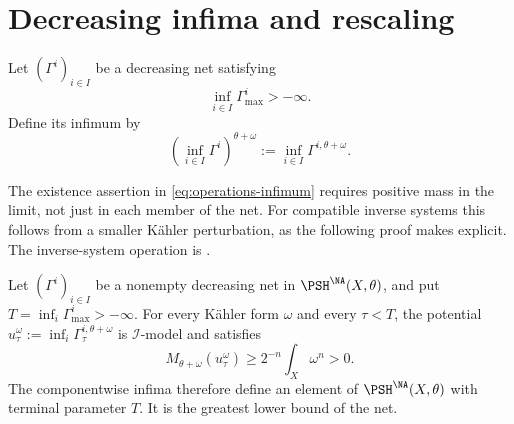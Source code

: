 \section{Decreasing infima and rescaling}
\label{sec:operations-infima-rescaling}

\begin{definition}
\label{def:operations-infimum}
Let $(\Gamma^i)_{i\in I}$ be a decreasing net satisfying
\[
                   \inf_{i\in I}\Gamma^i_{\max}>-\infty.
\tag{54.10}\label{eq:operations-inf-bound}
\]
Define its infimum by
\[
 \left(\inf_{i\in I}\Gamma^i\right)^{\theta+\omega}
 :=\inf_{i\in I}\Gamma^{i,\theta+\omega}.
\tag{54.11}\label{eq:operations-infimum}
\]
\end{definition}

The existence assertion in \eqref{eq:operations-infimum} requires
positive mass in the limit, not just in each member of the net.
For compatible inverse systems this follows from a smaller
K\"ahler perturbation, as the following proof makes explicit.
The inverse-system operation is
\cite[Definition~4.9 and Lemma~4.10]{XiaOperationsV3}.

\begin{proposition}\label{prop:operations-inf-positive-mass}
Let $(\Gamma^i)_{i\in I}$ be a nonempty decreasing net in
$\PSH^{\NA}(X,\theta)$, and put
$T=\inf_i\Gamma^i_{\max}>-\infty$.
For every K\"ahler form $\omega$ and every $\tau<T$, the potential
$u_\tau^\omega:=\inf_i\Gamma_\tau^{i,\theta+\omega}$
is $\mathcal I$-model and satisfies
\[
 M_{\theta+\omega}(u_\tau^\omega)
       \geq 2^{-n}\int_X\omega^n>0.
\tag{54.11a}\label{eq:operations-inf-mass-bound}
\]
The componentwise infima therefore define an element of
$\PSH^{\NA}(X,\theta)$ with terminal parameter $T$.
It is the greatest lower bound of the net.
\end{proposition}

